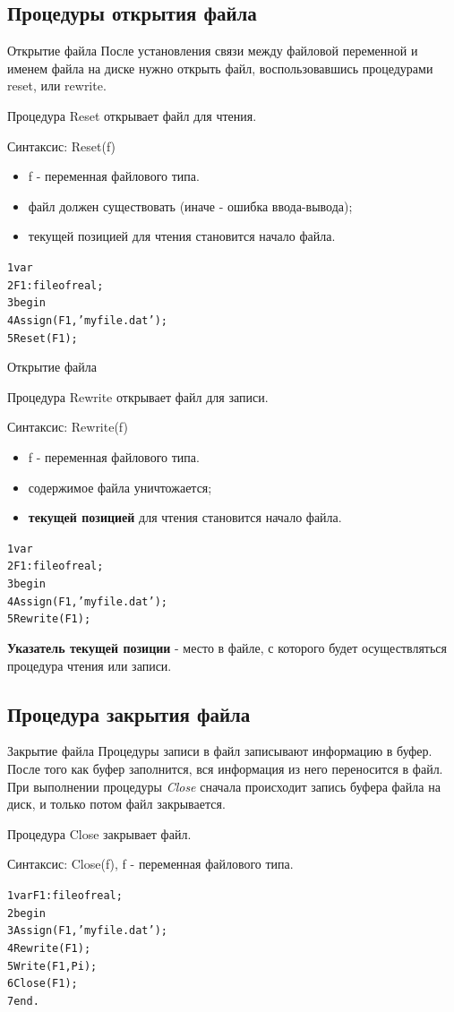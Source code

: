 \documentclass{beamer}
\begin{document}
\subsection{Процедуры открытия файла}
\begin{frame}[fragile]{Открытие файла}
После установления связи между файловой переменной и именем файла на диске нужно открыть файл, воспользовавшись процедурами reset, или rewrite.
\begin{block}{Процедура Reset}
открывает файл для чтения.
\end{block}
Синтаксис: Reset(f)
\begin{itemize}
\item f - переменная файлового типа.
\item файл должен существовать (иначе - ошибка ввода-вывода);
\item текущей позицией для чтения становится начало файла.
\end{itemize}
\begin{alltt}
 1 var                  
 2   F1: file of real;
 3 begin
 4   Assign(F1, 'myfile.dat');
 5   Reset(F1);
\end{alltt}
\end{frame} 

\begin{frame}[fragile]{Открытие файла}
\begin{block}{Процедура Rewrite}
открывает файл для записи.
\end{block}
Синтаксис: Rewrite(f)
\begin{itemize}
\item f - переменная файлового типа.
\item содержимое файла уничтожается;
\item \textbf{текущей позицией} для чтения становится начало файла.
\end{itemize}
\begin{alltt}
 1 var                  
 2   F1: file of real;
 3 begin
 4   Assign(F1, 'myfile.dat');
 5   Rewrite(F1);
\end{alltt}
\textbf{Указатель текущей позиции} - место в файле, с которого будет осуществляться процедура чтения или записи.
\end{frame} 

\subsection{Процедура закрытия файла}
\begin{frame}[fragile]{Закрытие файла}
Процедуры записи в файл записывают информацию в буфер. После того как буфер заполнится, вся информация из него переносится в файл. При выполнении процедуры \textit{Close} сначала происходит запись буфера файла на диск, и только потом файл закрывается.
\begin{block}{Процедура Close}
закрывает файл.
\end{block}
Синтаксис: Close(f), f - переменная файлового типа.
\begin{alltt}
 1 var F1: file of real;
 2 begin
 3   Assign(F1, 'myfile.dat');
 4   Rewrite(F1);
 5   Write(F1, Pi);
 6   Close(F1);
 7 end.
\end{alltt}
\end{frame} 
\end{document}
